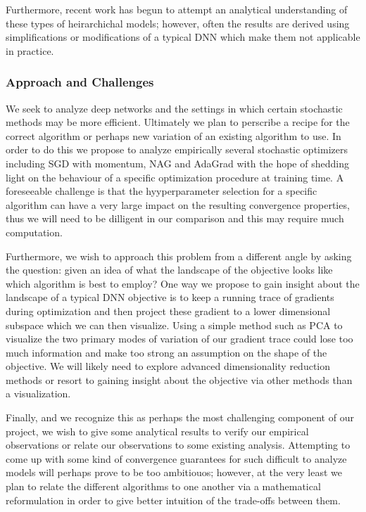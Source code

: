 \documentclass[12pt,english]{article}
\newcommand{\1}{\mathbb{I}} %
\begin{document}
Furthermore, recent work has begun to attempt an analytical understanding of
these types of heirarchichal models; however, often the results are derived using
simplifications or modifications of a typical DNN which make them not
applicable in practice. \cite{saxe_dl_dynamics} 

\subsubsection*{Approach and Challenges}

We seek to analyze deep networks and the settings in which certain stochastic
methods may be more efficient. Ultimately we plan to perscribe a recipe for the
correct algorithm or perhaps new variation of an existing algorithm to use. In
order to do this we propose to analyze empirically several stochastic
optimizers including SGD with momentum, NAG and AdaGrad with the hope of
shedding light on the behaviour of a specific optimization procedure at
training time. A foreseeable challenge is that the hyyperparameter selection
for a specific algorithm can have a very large impact on the resulting
convergence properties, thus we will need to be dilligent in our comparison and
this may require much computation.

Furthermore, we wish to approach this problem from a different angle by asking the
question: given an idea of what the landscape of the objective looks like which
algorithm is best to employ? One way we propose to gain insight about the
landscape of a typical DNN objective is to keep a running trace of gradients
during optimization and then project these gradient to a lower dimensional
subspace which we can then visualize.  Using a simple method such as PCA to
visualize the two primary modes of variation of our gradient trace could lose
too much information and make too strong an assumption on the shape of the
objective. We will likely need to explore advanced dimensionality reduction
methods or resort to gaining insight about the objective via other methods than
a visualization.

Finally, and we recognize this as perhaps the most challenging component of our
project, we wish to give some analytical results to verify our empirical
observations or relate our observations to some existing analysis. Attempting
to come up with some kind of convergence guarantees for such difficult to
analyze models will perhaps prove to be too ambitiouos; however, at the very
least we plan to relate the different algorithms to one another via a
mathematical reformulation in order to give better intuition of the trade-offs
between them.

{}

\end{document}
